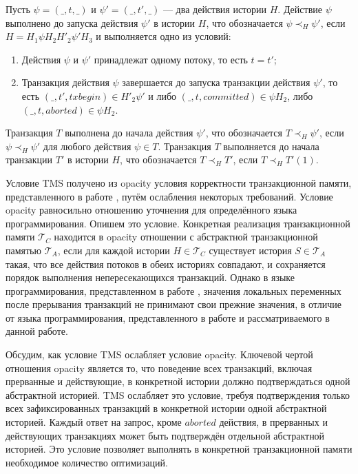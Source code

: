 \begin{mydefinition}\label{order}
Пусть $\psi = (\_, t, \_)$ и $\psi' = (\_, t', \_)$ --- два действия истории $H$. Действие $\psi$ выполнено до запуска действия $\psi'$ в истории $H$, что обозначается $\psi \prec_H \psi'$, если $H = H_1\psi{H_2}H'_2\psi'{H_3}$ и выполняется одно из условий:  
\begin{enumerate}[label = (\roman*)]
\item Действия $\psi$ и $\psi'$ принадлежат одному потоку, то есть $t = t'$;
\item Транзакция действия $\psi$ завершается до запуска транзакции действия $\psi'$, то есть $(\_, t', txbegin) \in H'_2\psi'$ и либо $(\_, t, committed) \in \psi{H_2}$, либо $(\_, t, aborted) \in \psi{H_2}$. 
\end{enumerate}
Транзакция $T$ выполнена до начала действия $\psi'$, что обозначается $T \prec_H \psi'$, если $\psi \prec_H \psi'$ для любого действия $\psi \in T$. 
Транзакция $T$ выполняется до начала транзакции $T'$ в истории $H$, что обозначается $T \prec_H T'$, если $T \prec_H T'(1)$.
\end{mydefinition}

Условие TMS получено из opacity условия корректности транзакционной памяти, представленного в работе \cite{opacity_article}, путём ослабления некоторых требований. Условие opacity равносильно отношению уточнения для определённого языка программирования. Опишем это условие. Конкретная реализация транзакционной памяти $\mathcal{T}_C$ находится в opacity отношении с абстрактной транзакционной памятью $\mathcal{T}_A$, если для каждой истории $H \in \mathcal{T}_C$ существует история $S \in \mathcal{T}_A$ такая, что все действия потоков в обеих историях совпадают, и сохраняется порядок выполнения непересекающихся транзакций. Однако в языке программирования, представленном в работе \cite{opacity_article}, значения локальных переменных после прерывания транзакций не принимают свои прежние значения, в отличие от языка программирования, представленного в работе \cite{tms_article} и рассматриваемого в данной работе. 

Обсудим, как условие TMS ослабляет условие opacity. Ключевой чертой отношения opacity является то, что поведение всех транзакций, включая прерванные и действующие, в конкретной истории должно подтверждаться одной абстрактной историей. TMS ослабляет это условие, требуя подтверждения только всех зафиксированных транзакций в конкретной истории одной абстрактной историей. Каждый ответ на запрос, кроме $aborted$ действия, в прерванных и действующих транзакциях может быть подтверждён отдельной абстрактной историей. Это условие позволяет выполнять в конкретной транзакционной памяти необходимое количество оптимизаций. 

